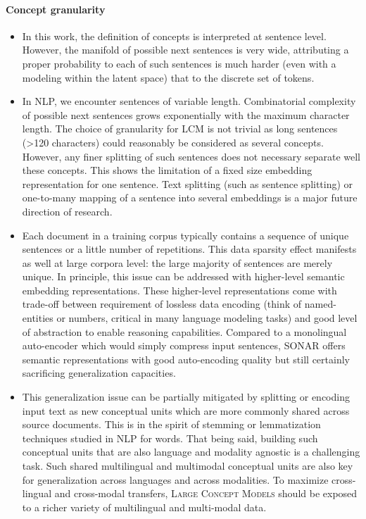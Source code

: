 \documentclass[twoside,11pt]{fairmeta}
\newcommand{\sonar}{\textsc{SONAR}\xspace}
\newcommand{\lcm}{\textsc{LCM}\xspace}
\newcommand{\LCMs}{\textsc{Large Concept Models}\xspace}
\begin{document}
\newpage
\paragraph{Concept granularity}
\begin{itemize}
    \item In this work, the definition of concepts is interpreted at sentence level. However, the manifold of possible next sentences is very wide, attributing a proper probability to each of such sentences is much harder (even with a modeling within the latent space) that to the discrete set of tokens.
    \item In NLP, we encounter sentences of variable length. Combinatorial complexity of possible next sentences grows exponentially with the maximum character length. 
    The choice of granularity for \lcm is not trivial as long sentences (>120 characters) could reasonably be considered as several concepts.
    However, any finer splitting of such sentences does not necessary separate well these concepts. This shows the limitation of a fixed size embedding representation for one sentence. Text splitting (such as sentence splitting) or one-to-many mapping of a sentence into several embeddings is a major future direction of research.
    \vspace{-0.5mm}
    \item Each document in a training corpus typically contains a sequence of unique sentences or a little number of repetitions. This data sparsity effect manifests as well at large corpora level: the large majority of sentences are merely unique. In principle, this issue can be addressed with higher-level semantic embedding representations. These higher-level representations come with trade-off between requirement of lossless data encoding (think of named-entities or numbers, critical in many language modeling tasks) and  good level of abstraction to enable reasoning capabilities. Compared to a monolingual auto-encoder which would simply compress input sentences, \sonar offers semantic representations with good auto-encoding quality but still certainly sacrificing generalization capacities.
    \vspace{-0.5mm}
    \item This generalization issue can be partially mitigated by splitting or encoding input text as new conceptual units which are more commonly shared across source documents. This is in the spirit of stemming or lemmatization techniques studied in NLP for words. 
    That being said, building such conceptual units that are also language and modality agnostic is a challenging task. Such shared multilingual and multimodal conceptual units are also key for generalization across languages and across modalities. To maximize cross-lingual and cross-modal transfers, \LCMs should be exposed to a richer variety of multilingual and multi-modal data.


\end{itemize}
\end{document}
